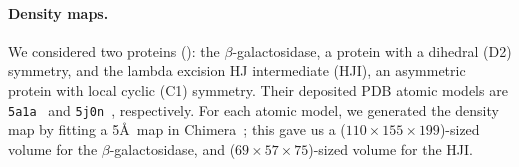 \paragraph{Density maps.}
We considered two proteins (): the $\beta$-galactosidase, a protein with a dihedral (D2) symmetry, and the lambda excision HJ intermediate (HJI), an asymmetric protein with local cyclic (C1) symmetry.
Their deposited PDB atomic models are \texttt{5a1a}~\cite{bartesaghi2015betagal} and \texttt{5j0n}~\cite{laxmikanthan2016structure}, respectively.
For each atomic model, we generated the density map by fitting a 5\AA\ map in Chimera~\cite{pettersen2004ucsf}; this gave us a ($110 \times 155 \times 199$)-sized volume for the $\beta$-galactosidase, and ($69 \times 57 \times 75$)-sized volume for the HJI.


